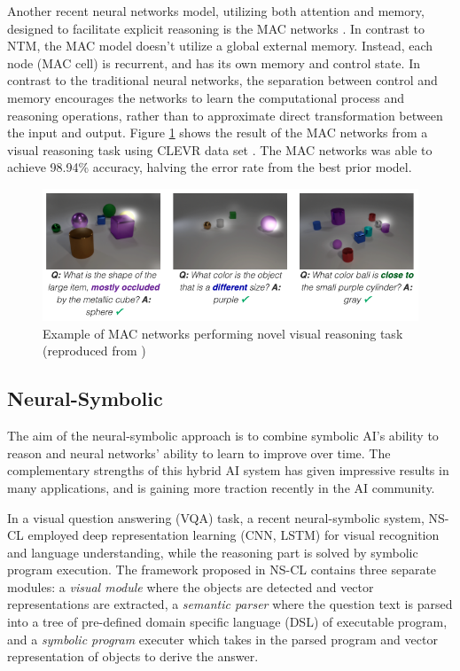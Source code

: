 \documentclass[journal]{IEEEtran}
\begin{document}
Another recent neural networks model, utilizing both attention and memory, designed to facilitate explicit reasoning is the MAC networks \cite{hudson2018compositional}.
In contrast to NTM, the MAC model doesn't utilize a global external memory. Instead, each node (MAC cell) is recurrent, and has its own memory and control state.
In contrast to the traditional neural networks, the separation between control and memory encourages the networks to 
learn the computational process and reasoning operations, rather than to approximate direct transformation between the input and output.
Figure \ref{mac-clevr} shows the result of the MAC networks from a visual reasoning task using CLEVR data set \cite{johnson2017clevr}. 
The MAC networks was able to achieve 98.94\% accuracy, halving the error rate from the best prior model.
\begin{figure}[htb]
  \includegraphics[width=\linewidth]{mac-clevr.png}
  \caption{Example of MAC networks performing novel visual reasoning task (reproduced from \cite{hudson2018compositional})}
  \label{mac-clevr}
\end{figure}

\subsection{Neural-Symbolic}
The aim of the neural-symbolic approach is to combine symbolic AI's ability to reason 
and neural networks' ability to learn to improve over time. 
The complementary strengths of this hybrid AI system has given impressive results in many applications, 
and is gaining more traction recently in the AI community.

In a visual question answering (VQA) task, a recent neural-symbolic system, NS-CL \cite{Mao2019NeuroSymbolic} employed deep representation learning (CNN, LSTM)
for visual recognition and language understanding, while the reasoning part is solved by symbolic program execution.
The framework proposed in NS-CL contains three separate modules: 
a \textit{visual module} where the objects are detected and vector representations are extracted, 
a \textit{semantic parser} where the question text is parsed into a tree of pre-defined domain specific language (DSL) of executable program,
and a \textit{symbolic program} executer which takes in the parsed program and vector representation of objects to derive the answer. 
\end{document}
